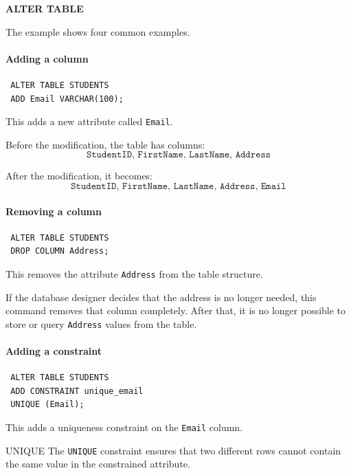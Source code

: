  \begin{example}{\textbf{ALTER TABLE}}

 The example shows four common examples.

 \paragraph{Adding a column}

 \begin{verbatim}
 ALTER TABLE STUDENTS
 ADD Email VARCHAR(100);
 \end{verbatim}

\vspace{-0.3cm}
 This adds a new attribute called \texttt{Email}.


  Before the modification, the table has columns:
  \[
   \texttt{StudentID, FirstName, LastName, Address}
  \]

  After the modification, it becomes:
  \[
   \texttt{StudentID, FirstName, LastName, Address, Email}
  \]


 \pagebreak
 \paragraph{Removing a column}

 \begin{verbatim}
 ALTER TABLE STUDENTS
 DROP COLUMN Address;
 \end{verbatim}

 \vspace{-0.3cm}
 This removes the attribute \texttt{Address} from the table structure.


  If the database designer decides that the address is no longer needed, this command removes that column completely. After that, it is no longer possible to store or query \texttt{Address} values from the table.


 \paragraph{Adding a constraint}

 \begin{verbatim}
 ALTER TABLE STUDENTS
 ADD CONSTRAINT unique_email
 UNIQUE (Email);
 \end{verbatim}

 \vspace{-0.3cm}
 This adds a uniqueness constraint on the \texttt{Email} column.

 \begin{defbox}{UNIQUE}
  The \texttt{UNIQUE} constraint ensures that two different rows cannot contain the same value in the constrained attribute.
 \end{defbox}


\end{example}
